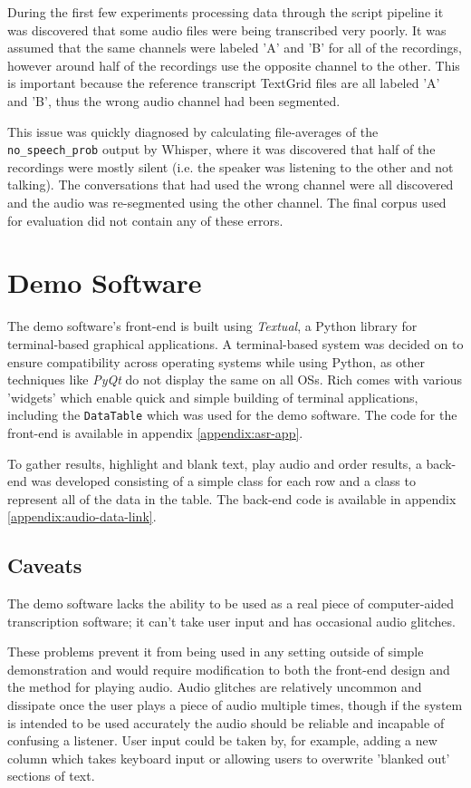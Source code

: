 During the first few experiments processing data through the script pipeline it was discovered that some audio files were being transcribed very poorly.
It was assumed that the same channels were labeled 'A' and 'B' for all of the recordings, however around half of the recordings use the opposite channel to the other.
This is important because the reference transcript TextGrid files are all labeled 'A' and 'B', thus the wrong audio channel had been segmented.

This issue was quickly diagnosed by calculating file-averages of the \texttt{no\_speech\_prob} output by Whisper, where it was discovered that half of the recordings were mostly silent (i.e. the speaker was listening to the other and not talking).
The conversations that had used the wrong channel were all discovered and the audio was re-segmented using the other channel.
The final corpus used for evaluation did not contain any of these errors.

\section{Demo Software}

The demo software's front-end is built using \emph{Textual}\cite{textual}, a Python library for terminal-based graphical applications.
A terminal-based system was decided on to ensure compatibility across operating systems while using Python, as other techniques like \emph{PyQt}\cite{pyqt} do not display the same on all OSs.
Rich comes with various 'widgets' which enable quick and simple building of terminal applications, including the \texttt{DataTable} which was used for the demo software.
The code for the front-end is available in appendix \ref{appendix:asr-app}.

To gather results, highlight and blank text, play audio and order results, a back-end was developed consisting of a simple class for each row and a class to represent all of the data in the table.
The back-end code is available in appendix \ref{appendix:audio-data-link}.

\subsection{Caveats}

The demo software lacks the ability to be used as a real piece of computer-aided transcription software;
it can't take user input and has occasional audio glitches.

These problems prevent it from being used in any setting outside of simple demonstration and would require modification to both the front-end design and the method for playing audio.
Audio glitches are relatively uncommon and dissipate once the user plays a piece of audio multiple times, though if the system is intended to be used accurately the audio should be reliable and incapable of confusing a listener.
User input could be taken by, for example, adding a new column which takes keyboard input or allowing users to overwrite 'blanked out' sections of text.
